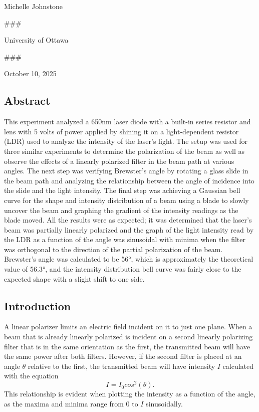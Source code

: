 \documentclass[11pt]{article}
\begin{document}
Michelle Johnstone

    \#\#\#

University of Ottawa

    \#\#\#

October 10, 2025

    \hypertarget{abstract}{%
\subsection{Abstract}\label{abstract}}

    This experiment analyzed a 650nm laser diode with a built-in series
resistor and lens with 5 volts of power applied by shining it on a
light-dependent resistor (LDR) used to analyze the intensity of the
laser's light. The setup was used for three similar experiments to
determine the polarization of the beam as well as observe the effects of
a linearly polarized filter in the beam path at various angles. The next
step was verifying Brewster's angle by rotating a glass slide in the
beam path and analyzing the relationship between the angle of incidence
into the slide and the light intensity. The final step was achieving a
Gaussian bell curve for the shape and intensity distribution of a beam
using a blade to slowly uncover the beam and graphing the gradient of
the intensity readings as the blade moved. All the results were as
expected; it was determined that the laser's beam was partially linearly
polarized and the graph of the light intensity read by the LDR as a
function of the angle was sinusoidal with minima when the filter was
orthogonal to the direction of the partial polarization of the beam.
Brewster's angle was calculated to be 56°, which is approximately the
theoretical value of 56.3°, and the intensity distribution bell curve
was fairly close to the expected shape with a slight shift to one side.

    \hypertarget{introduction}{%
\subsection{Introduction}\label{introduction}}

    A linear polarizer limits an electric field incident on it to just one
plane. When a beam that is already linearly polarized is incident on a
second linearly polarizing filter that is in the same orientation as the
first, the transmitted beam will have the same power after both filters.
However, if the second filter is placed at an angle \(\theta\) relative
to the first, the transmitted beam will have intensity \(I\) calculated
with the equation \[I = I_0 cos^2(\theta). \tag{1}\] This relationship
is evident when plotting the intensity as a function of the angle, as
the maxima and minima range from 0 to \(I\) sinusoidally.
\end{document}
